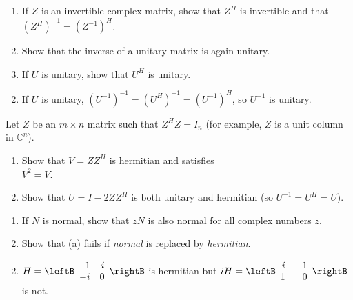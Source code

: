 \begin{multicols}{2}
\begin{ex}
\begin{enumerate}[label={\alph*.}]
\end{enumerate}
\end{ex}


\begin{ex}
\begin{enumerate}[label={\alph*.}]
\item If $Z$ is an invertible complex matrix, show that $Z^{H}$ is invertible and that $(Z^{H})^{-1} = (Z^{-1})^{H}$.

\item Show that the inverse of a unitary matrix is again unitary.

\item If $U$ is unitary, show that $U^{H}$ is unitary.

\end{enumerate}
\begin{sol}
\begin{enumerate}[label={\alph*.}]
\setcounter{enumi}{1}
\item  If $U$ is unitary, $(U^{-1})^{-1} = (U^{H})^{-1} = (U^{-1})^{H}$, so $U^{-1}$ is unitary.

\end{enumerate}
\end{sol}
\end{ex}

\begin{ex}
Let $Z$ be an $m \times n$ matrix such that $Z^{H}Z = I_{n}$ (for example, $Z$ is a unit column in $\mathbb{C}^n$).

\begin{enumerate}[label={\alph*.}]
\item Show that $V = ZZ^{H}$ is hermitian and satisfies \\ $V^{2} = V$.

\item Show that $U = I - 2ZZ^{H}$ is both unitary and hermitian (so $U^{-1} = U^{H} = U$).

\end{enumerate}
\end{ex}

\begin{ex}
\begin{enumerate}[label={\alph*.}]
\item If $N$ is normal, show that $zN$ is also normal for all complex numbers $z$.

\item Show that (a) fails if \textit{normal} is replaced by \textit{hermitian}.

\end{enumerate}
\begin{sol}
\begin{enumerate}[label={\alph*.}]
\setcounter{enumi}{1}
\item  $H = \leftB \begin{array}{rr}
1 & i \\
-i & 0
\end{array}\rightB$ is hermitian but $iH = \leftB \begin{array}{rr}
i & -1 \\
1 & 0
\end{array}\rightB$ is not.


\end{enumerate}
\end{sol}
\end{ex}
\end{multicols}
